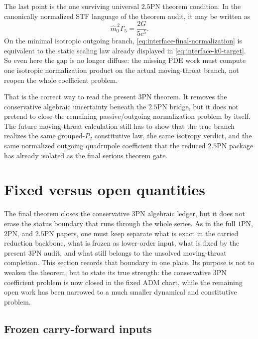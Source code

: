 \documentclass[11pt]{article}
\begin{document}
The last point is the one surviving universal $2.5$PN theorem condition.  In the
canonically normalized STF language of the theorem audit, it may be written as
\begin{equation}
\boxed{\hat m_0^{\,2}\Gamma_5=\frac{2G}{5c^5}.}
\label{eq:interface-final-normalization}
\end{equation}
On the minimal isotropic outgoing branch,
\eqref{eq:interface-final-normalization} is equivalent to the static scaling law
already displayed in \eqref{eq:interface-k0-target}.  So even here the gap is
no longer diffuse: the missing PDE work must compute one isotropic normalization
product on the actual moving-throat branch, not reopen the whole coefficient
problem.

That is the correct way to read the present $3$PN theorem.  It removes the
conservative algebraic uncertainty beneath the $2.5$PN bridge, but it does not
pretend to close the remaining passive/outgoing normalization problem by itself.
The future moving-throat calculation still has to show that the true branch
realizes the same grouped-$P_2$ constitutive law, the same isotropy verdict, and
the same normalized outgoing quadrupole coefficient that the reduced $2.5$PN
package has already isolated as the final serious theorem gate.


\section{Fixed versus open quantities}
\label{sec:fixed-open}

The final theorem closes the conservative $3$PN algebraic ledger, but it does not
erase the status boundary that runs through the whole series.  As in the full
$1$PN, $2$PN, and $2.5$PN papers, one must keep separate what is exact in the
carried reduction backbone, what is frozen as lower-order input, what is fixed
by the present $3$PN audit, and what still belongs to the unsolved
moving-throat completion.  This section records that boundary in one place.
Its purpose is not to weaken the theorem, but to state its true strength: the
conservative $3$PN coefficient problem is now closed in the fixed ADM chart,
while the remaining open work has been narrowed to a much smaller dynamical and
constitutive problem.

\subsection{Frozen carry-forward inputs}
\label{sec:fixed-open-inputs}
\end{document}
